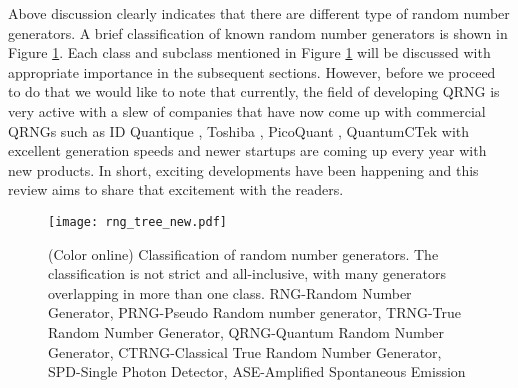 \documentclass[]{interact}
\theoremstyle{plain}%
\theoremstyle{definition}
\theoremstyle{remark}
\begin{document}
Above discussion clearly indicates that there are different type of random number generators. A brief classification of known random number generators is shown in Figure \ref{rng}. Each class and subclass mentioned in Figure \ref{rng} will be discussed with appropriate importance in the subsequent sections. However, before we proceed to do that we would like to note that currently, the field of developing QRNG is very active with a slew of companies that have now come up with commercial QRNGs such as  ID Quantique \cite{QuantisQ20:online}, Toshiba \cite{httpswww1:online}, PicoQuant \cite{QuantumR34:online}, QuantumCTek \cite{QuantumR81:online} with excellent generation speeds and newer startups are coming up every year with new products. In short, exciting developments have been happening and this review aims to share that excitement with the readers. 

\begin{figure}
    \centering
    \texttt{[image: rng\_tree\_new.pdf]}
    \caption{(Color online) Classification of random number generators. The classification is not strict and all-inclusive, with many generators overlapping in more than one class. RNG-Random Number Generator, PRNG-Pseudo Random number generator, TRNG-True Random Number Generator, QRNG-Quantum Random Number Generator, CTRNG-Classical True Random Number Generator, SPD-Single Photon Detector, ASE-Amplified Spontaneous Emission}
    \label{rng}
\end{figure}
\end{document}
